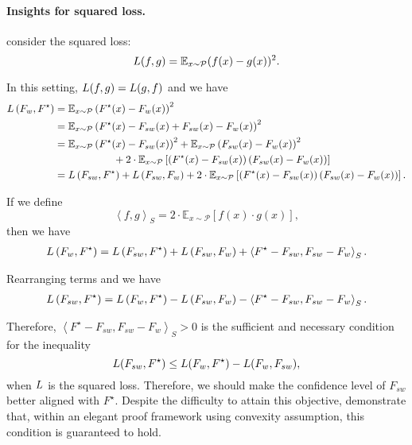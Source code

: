 \paragraph{Insights for squared loss.} 
\citet{charikar2024quantifying} consider the squared loss:
$$L(f, g)=\mathbb{E}_{x \sim \mathcal{P}}(f(x)-g(x))^2.$$

In this setting, $L(f, g)=L(g, f)$ and we have
\begin{align*}
L\left(F_w, F^\star\right) & = \mathbb{E}_{x \sim \mathcal{P}}\left(F^\star(x)-F_w(x)\right)^2 \\
& = \mathbb{E}_{x \sim \mathcal{P}}\left(F^\star(x)-F_{sw}(x)+F_{sw}(x)-F_w(x)\right)^2 \\
& = \mathbb{E}_{x \sim \mathcal{P}}\left(F^\star(x)-F_{sw}(x)\right)^2+\mathbb{E}_{x \sim \mathcal{P}}\left(F_{sw}(x)-F_w(x)\right)^2 \\ & \hspace{2cm} +2 \cdot \mathbb{E}_{x \sim \mathcal{P}}\left[\left(F^\star(x)-F_{sw}(x)\right)\left(F_{sw}(x)-F_w(x)\right)\right] \\
& = L\left(F_{s w}, F^\star\right)+L\left(F_{s w}, F_w\right) +2 \cdot \mathbb{E}_{x \sim \mathcal{P}}\left[\left(F^\star(x)-F_{sw}(x)\right)\left(F_{sw}(x)-F_w(x)\right)\right].
\end{align*}

If we define
$$\left \langle f,g \right \rangle_S = 2 \cdot \mathbb{E}_{x \sim \mathcal{P}} \left[ f(x) \cdot g(x) \right],$$
then we have
\begin{align*}
    L\left(F_w, F^\star\right) = L\left(F_{s w}, F^\star\right)+L\left(F_{s w}, F_w\right) + \left \langle F^\star - F_{sw}, F_{sw}-F_w \right \rangle_S.
\end{align*}

Rearranging terms and we have
\begin{align} \label{suff_necc_condition_squared}
    L\left(F_{s w}, F^\star\right) = L\left(F_w, F^\star\right)-L\left(F_{s w}, F_w\right) - \left \langle F^\star - F_{sw}, F_{sw}-F_w \right \rangle_S.
\end{align}

Therefore, $\left \langle F^\star - F_{sw}, F_{sw}-F_w \right \rangle_S > 0$ is the sufficient and necessary condition for the inequality $$L(F_{sw}, F^\star) \le L(F_w, F^\star) - L(F_w, F_{sw}),$$
when $L$ is the squared loss.
Therefore, we should make the confidence level of $F_{sw}$ better aligned with $F^\star$.
Despite the difficulty to attain this objective, \citet{charikar2024quantifying} demonstrate that, within an elegant proof framework using convexity assumption, this condition is guaranteed to hold.












